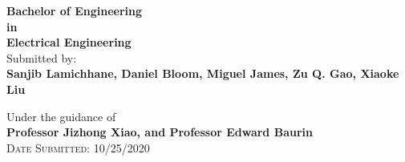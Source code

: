 \begin{titlepage}
\begin{center}
		{\bf Bachelor of Engineering \\in\\ Electrical Engineering}\\[0.5in]
		
		\normalsize Submitted by: \\
		\textbf{Sanjib Lamichhane, Daniel Bloom, Miguel James, Zu Q. Gao, Xiaoke Liu}
		
		\vspace{1cm}
		Under the guidance of\\
		{\textbf{Professor Jizhong Xiao, and Professor Edward Baurin}}\\[0.2in]
		\textsc{Date Submitted: 10/25/2020}
	\end{center}
	
\end{titlepage}